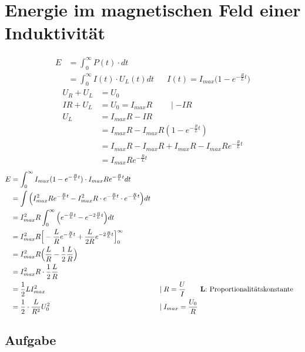\documentclass{article}
\begin{document}
	\section{Energie im magnetischen Feld einer Induktivität}
	\begin{align}
		E &= \int_{0}^{\infty} P(t) \cdot dt\\
		&= \int_{0}^{\infty} I(t) \cdot U_L (t) dt
		&& I(t) = I_{max}  \Big (1 - e^{- \frac{R}{L} t} \Big )
	\end{align}
	\begin{align}
		U_R + U_L &= U_0\\
		IR + U_L &= U_0 = I_{max} R \qquad \mid - IR\\
		U_L &= I_{max} R - I R\\
		&= I_{max} R - I_{max} R (1 - e^{- \frac{R}{L} t})\\
		&= I_{max} R - I_{max} R + I_{max} R - I_{max} R  e^{- \frac{R}{L} t}\\
		&= I_{max} R e^{- \frac{R}{L} t}
	\end{align}
	\begin{align}
		E &= \int_{0}^{\infty} I_{max} (1 - e^{- \frac{R}{L} t}) \cdot I_{max} R e^{-\frac{R}{L} t} dt\\
		&= \int \Big (I_{max}^2 R e^{- \frac{R}{L} t} - I_{max}^2 R
		\cdot e^{- \frac{R}{L} t}\cdot e^{- \frac{R}{L} t} \Big ) dt\\
		&= I_{max}^2 R \int_{0}^{\infty} \Big (e^{- \frac{R}{L} t} - e^{-2 \frac{R}{L} t} \Big) dt\\
		&= I_{max}^2 R \Big [- \frac{L}{R} e^{- \frac{R}{L} t} +
		\frac{L}{2R} e^{-2 \frac{R}{L} t}\Big]_0^\infty\\
		&= I_{max}^2 R \Big (\frac{L}{R} - \frac{1}{2} \frac{L}{R} \Big) \\
		&= I_{max}^2 R \cdot \frac{1}{2} \frac{L}{R}\\
		&= \frac{1}{2} L I_{max}^2 && \mid R = \frac{U}{I} 
		\qquad \text{\textbf{L}: Proportionalitätskonstante}\\
		&= \frac{1}{2} \cdot \frac{L}{R^2} U_0^2
		&& \mid I_{max} = \frac{U_0}{R}
	\end{align}
	
	\vspace{0.5cm}
	
	\subsection*{Aufgabe}
\end{document}
